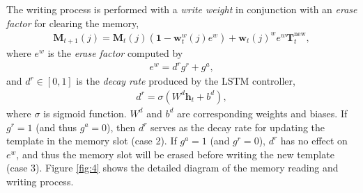 \documentclass[runningheads]{llncs}
\begin{document}
The writing process is performed with a \textit{write weight} in conjunction with an \textit{erase factor} for clearing the memory, 
\begin{align}
\mathbf{M}_{t+1}(j) = \mathbf{M}_{t}(j)(\mathbf{1}-\mathbf{w}^w_t(j)e^w)+\mathbf{w}_t(j)^we^w\mathbf{T}^{\text{new}}_t,
\end{align}
where %
$e^w$ is the \textit{erase factor} computed by
\begin{align}
e^w = d^rg^r+g^a,
\end{align}
and $d^r \in [0,1]$ is the \textit{decay rate} produced by the LSTM controller, 
\begin{align}
d^r = \sigma (W^d\mathbf{h}_{t}+b^d),
\end{align}
where $\sigma$ is sigmoid function. $W^d$ and $b^d$ are corresponding weights and biases. If $g^r=1$ (and thus $g^a=0$), then $d^r$ serves as the decay rate for updating the template in the memory slot (case 2). If $g^a=1$ (and $g^r=0$), $d^r$ has no effect on $e^w$, and thus the memory slot will be erased before writing the new template (case 3). Figure \ref{fig:4} shows the detailed diagram of the memory reading and writing process.
\end{document}
